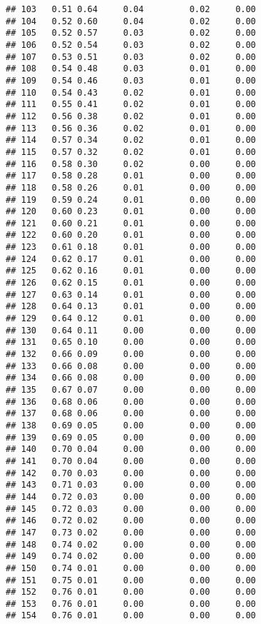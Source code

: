 \documentclass[
]{article}
\begin{document}
\begin{verbatim}
## 103   0.51 0.64     0.04         0.02     0.00
## 104   0.52 0.60     0.04         0.02     0.00
## 105   0.52 0.57     0.03         0.02     0.00
## 106   0.52 0.54     0.03         0.02     0.00
## 107   0.53 0.51     0.03         0.02     0.00
## 108   0.54 0.48     0.03         0.01     0.00
## 109   0.54 0.46     0.03         0.01     0.00
## 110   0.54 0.43     0.02         0.01     0.00
## 111   0.55 0.41     0.02         0.01     0.00
## 112   0.56 0.38     0.02         0.01     0.00
## 113   0.56 0.36     0.02         0.01     0.00
## 114   0.57 0.34     0.02         0.01     0.00
## 115   0.57 0.32     0.02         0.01     0.00
## 116   0.58 0.30     0.02         0.00     0.00
## 117   0.58 0.28     0.01         0.00     0.00
## 118   0.58 0.26     0.01         0.00     0.00
## 119   0.59 0.24     0.01         0.00     0.00
## 120   0.60 0.23     0.01         0.00     0.00
## 121   0.60 0.21     0.01         0.00     0.00
## 122   0.60 0.20     0.01         0.00     0.00
## 123   0.61 0.18     0.01         0.00     0.00
## 124   0.62 0.17     0.01         0.00     0.00
## 125   0.62 0.16     0.01         0.00     0.00
## 126   0.62 0.15     0.01         0.00     0.00
## 127   0.63 0.14     0.01         0.00     0.00
## 128   0.64 0.13     0.01         0.00     0.00
## 129   0.64 0.12     0.01         0.00     0.00
## 130   0.64 0.11     0.00         0.00     0.00
## 131   0.65 0.10     0.00         0.00     0.00
## 132   0.66 0.09     0.00         0.00     0.00
## 133   0.66 0.08     0.00         0.00     0.00
## 134   0.66 0.08     0.00         0.00     0.00
## 135   0.67 0.07     0.00         0.00     0.00
## 136   0.68 0.06     0.00         0.00     0.00
## 137   0.68 0.06     0.00         0.00     0.00
## 138   0.69 0.05     0.00         0.00     0.00
## 139   0.69 0.05     0.00         0.00     0.00
## 140   0.70 0.04     0.00         0.00     0.00
## 141   0.70 0.04     0.00         0.00     0.00
## 142   0.70 0.03     0.00         0.00     0.00
## 143   0.71 0.03     0.00         0.00     0.00
## 144   0.72 0.03     0.00         0.00     0.00
## 145   0.72 0.03     0.00         0.00     0.00
## 146   0.72 0.02     0.00         0.00     0.00
## 147   0.73 0.02     0.00         0.00     0.00
## 148   0.74 0.02     0.00         0.00     0.00
## 149   0.74 0.02     0.00         0.00     0.00
## 150   0.74 0.01     0.00         0.00     0.00
## 151   0.75 0.01     0.00         0.00     0.00
## 152   0.76 0.01     0.00         0.00     0.00
## 153   0.76 0.01     0.00         0.00     0.00
## 154   0.76 0.01     0.00         0.00     0.00

\end{verbatim}
\end{document}

